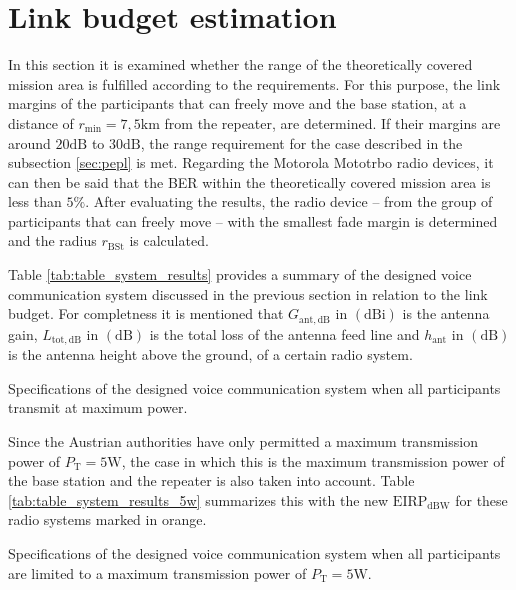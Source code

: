 \section{Link budget estimation}
In this section it is examined whether the range of the theoretically covered mission area is fulfilled according to the requirements. For this purpose, the link margins of the participants that can freely move and the base station, at a distance of $r_\mathrm{min}= 7,5\mathrm{km}$ from the repeater, are determined. If their margins are around $20\mathrm{dB}$ to $30\mathrm{dB}$, the range requirement for the case described in the subsection \ref{sec:pepl} is met. Regarding the Motorola Mototrbo radio devices, it can then be said that the BER within the theoretically covered mission area is less than $5\%$. After evaluating the results, the radio device -- from the group of participants that can freely move -- with the smallest fade margin is determined and the radius $r_\mathrm{BSt}$ is calculated.

Table \ref{tab:table_system_results} provides a summary of the designed voice communication system discussed in the previous section in relation to the link budget. For completness it is mentioned that $G_\mathrm{ant,dB}$ in $\left(\mathrm{dBi}\right)$ is the antenna gain, $L_\mathrm{tot,dB}$ in $\left(\mathrm{dB}\right)$ is the total loss of the antenna feed line and $h_\mathrm{ant}$ in $\left(\mathrm{dB}\right)$ is the antenna height above the ground, of a certain radio system.
\begin{table}[h!]
	\centering
	
	\caption{Specifications of the designed voice communication system when all participants transmit at maximum power.}
	\label{tab:table_system_results}
\end{table}

Since the Austrian authorities have only permitted a maximum transmission power of $P_\mathrm{T} = 5\mathrm{W}$, the case in which this is the maximum transmission power of the base station and the repeater is also taken into account. Table \ref{tab:table_system_results_5w} summarizes this with the new $\mathrm{EIRP}_\mathrm{dBW}$ for these radio systems marked in orange. 
\begin{table}[h!]
	\centering
	
	\caption{Specifications of the designed voice communication system when all participants are limited to a maximum transmission power of $P_\mathrm{T} = 5\mathrm{W}$.}
	\label{tab:table_system_results_5w}
\end{table}




 
 